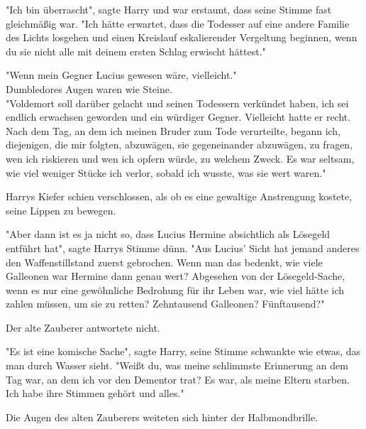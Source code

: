 {"Ich bin überrascht", sagte Harry und war erstaunt, dass seine Stimme fast gleichmäßig war. "Ich hätte erwartet, dass die Todesser auf eine andere Familie des Lichts losgehen und einen Kreislauf eskalierender Vergeltung beginnen, wenn du sie nicht alle mit deinem ersten Schlag erwischt hättest."

"Wenn mein Gegner Lucius gewesen wäre, vielleicht."\\ Dumbledores Augen waren wie Steine.\\ "Voldemort soll darüber gelacht und seinen Todessern verkündet haben, ich sei endlich erwachsen geworden und ein würdiger Gegner. Vielleicht hatte er recht. Nach dem Tag, an dem ich meinen Bruder zum Tode verurteilte, begann ich, diejenigen, die mir folgten, abzuwägen, sie gegeneinander abzuwägen, zu fragen, wen ich riskieren und wen ich opfern würde, zu welchem Zweck. Es war seltsam, wie viel weniger Stücke ich verlor, sobald ich wusste, was sie wert waren."

Harrys Kiefer schien verschlossen, als ob es eine gewaltige Anstrengung kostete, seine Lippen zu bewegen.

"Aber dann ist es ja nicht so, dass Lucius Hermine absichtlich als Lösegeld entführt hat", sagte Harrys Stimme dünn. "Aus Lucius' Sicht hat jemand anderes den Waffenstillstand zuerst gebrochen. Wenn man das bedenkt, wie viele Galleonen war Hermine dann genau wert? Abgesehen von der Lösegeld-Sache, wenn es nur eine gewöhnliche Bedrohung für ihr Leben war, wie viel hätte ich zahlen müssen, um sie zu retten? Zehntausend Galleonen? Fünftausend?"

Der alte Zauberer antwortete nicht.

"Es ist eine komische Sache", sagte Harry, seine Stimme schwankte wie etwas, das man durch Wasser sieht. "Weißt du, was meine schlimmste Erinnerung an dem Tag war, an dem ich vor den Dementor trat? Es war, als meine Eltern starben. Ich habe ihre Stimmen gehört und alles."

Die Augen des alten Zauberers weiteten sich hinter der Halbmondbrille.

}
